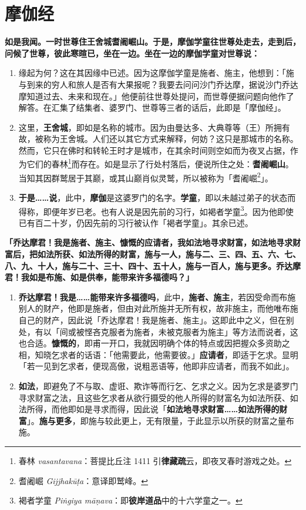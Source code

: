 \section{摩伽经}

\textbf{如是我闻。一时世尊住王舍城耆阇崛山。于是，摩伽学童往世尊处走去，走到后，问候了世尊，彼此寒暄已，坐在一边。坐在一边的摩伽学童对世尊说：}

\begin{enumerate}\item 缘起为何？这在其因缘中已述。因为这摩伽学童是施者、施主，他想到：「施与到来的穷人和旅人是否有大果报呢？我要去问问沙门乔达摩，据说沙门乔达摩知道过去、未来和现在。」他便前往世尊处提问，而世尊便据问题向他作了解答。在汇集了结集者、婆罗门、世尊等三者的话后，此即是「摩伽经」。
\item 这里，\textbf{王舍城}，即如是名称的城市。因为由曼达多、大典尊等（王）所拥有故，被称为王舍城。人们还以其它方式来解释，何妨？这只是那城市的名称。然而，它只在佛时和转轮王时才是城市，在其余时间则空如而为夜叉占据，作为它们的春林\footnote{春林 \textit{vasantavana}：菩提比丘注 1411 引\textbf{律藏疏}云，即夜叉春时游戏之处。}而存在。如是显示了行处村落后，便说所住之处：\textbf{耆阇崛山}。当知其因群鹫居于其巅，或其山巅肖似灵鹫，所以被称为「耆阇崛\footnote{耆阇崛 \textit{Gijjhakūṭa}：意译即鹫峰。}」。
\item \textbf{于是……说}，此中，\textbf{摩伽}是这婆罗门的名字。\textbf{学童}，即以未越过弟子的状态而得称，即便年岁已老。也有人说是因先前的习行，如褐者学童\footnote{褐者学童 \textit{Piṅgiya māṇava}：即\textbf{彼岸道品}中的十六学童之一。}。因为他即使已有百二十岁，仍因先前的习行被认作「褐者学童」。其余已述。\end{enumerate}

\textbf{「乔达摩君！我是施者、施主、慷慨的应请者，我如法地寻求财富，如法地寻求财富后，把如法所获、如法所得的财富，施与一人，施与二、三、四、五、六、七、八、九、十人，施与二十、三十、四十、五十人，施与一百人，施与更多。乔达摩君！我如是布施、如是供奉，能带来许多福德吗？」}

\begin{enumerate}\item \textbf{乔达摩君！我是……能带来许多福德吗}，此中，\textbf{施者、施主}，若因受命而布施别人的财产，他即是施者，但由对此所施并无所有权，故非施主，而他唯布施自己的财产，因此说「乔达摩君！我是施者、施主」。这即此中之义，但在别处，有以「间或被悭吝克服者为施者，未被克服者为施主」等方法而说者，这也合适。\textbf{慷慨的}，即甫一开口，我就因明确个体的特点或因把握众多资助之相，知晓乞求者的话语：「他需要此，他需要彼。」\textbf{应请者}，即适于乞求。显明「若一见到乞求者，便现高傲，说粗恶语等，他即非应请者，而我不如此」。
\item \textbf{如法}，即避免了不与取、虚诳、欺诈等而行乞、乞求之义。因为乞求是婆罗门寻求财富之法，且这些乞求者从欲行摄受的他人所得的财富名为如法所获、如法所得，而他即如是寻求而得，因此说「\textbf{如法地寻求财富……如法所得的财富}」。\textbf{施与更多}，即施与较此更上，无有限量，于此显示以所获的财富之量布施。\end{enumerate}

